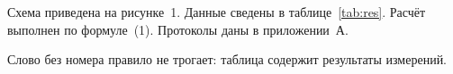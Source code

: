 Схема приведена на рисунке~1.
Данные сведены в таблице~\ref{tab:res}.
Расчёт выполнен по формуле~(1).
Протоколы даны в приложении~А.

Слово без номера правило не трогает: таблица содержит результаты измерений.
